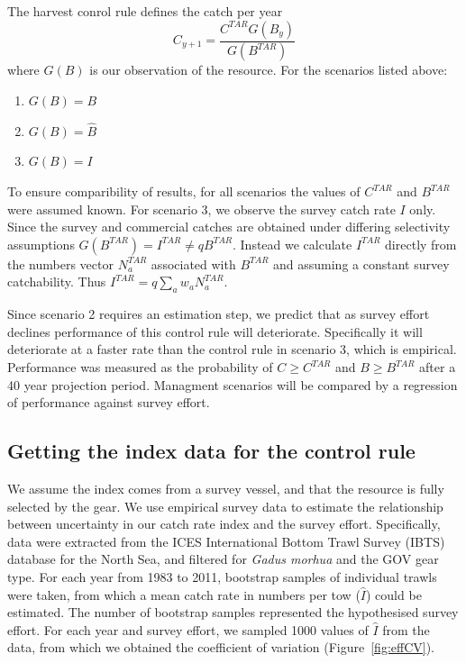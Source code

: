\documentclass[a4paper]{article}
\begin{document}
The harvest conrol rule defines the catch per year
\[
C_{y+1} = \frac{C^{TAR}G(B_y)}{G(B^{TAR})}
\]
where $G(B)$ is our observation of the resource. For the scenarios listed above:
\begin{enumerate}
\item $G(B) = B$
\item $G(B) = \hat{B}$
\item $G(B) = I$
\end{enumerate}

To ensure comparibility of results, for all scenarios the values of $C^{TAR}$ and $B^{TAR}$ were assumed known. 
For scenario 3, we observe the survey catch rate $I$ only. Since the survey and commercial catches are obtained under differing
selectivity assumptions $G(B^{TAR}) = I^{TAR} \neq qB^{TAR}$. Instead we calculate $I^{TAR}$ directly from the numbers vector $N^{TAR}_a$
associated with $B^{TAR}$ and assuming a constant survey catchability. Thus $I^{TAR} = q\sum_a{w_a N^{TAR}_a}$.

Since scenario 2 requires an estimation step, we predict that as survey effort declines performance of this control rule will deteriorate.
Specifically it will deteriorate at a faster rate than the control rule in scenario 3, which is empirical. Performance was measured as the 
probability of $C\geq C^{TAR}$ and $B\geq B^{TAR}$ after a 40 year projection period. Managment scenarios will be compared by a regression of 
performance against survey effort. 


\subsection{Getting the index data for the control rule}

We assume the index comes from a survey vessel, and that the resource is fully selected by the gear. 
We use empirical survey data to estimate the relationship between uncertainty in our catch rate index and the survey effort. Specifically, data
were extracted from the ICES International Bottom Trawl Survey (IBTS) database for the North Sea, and filtered for \textit{Gadus morhua} and the GOV gear type.
For each year from 1983 to 2011, bootstrap samples of individual trawls were taken, from which a mean catch rate in numbers per tow ($\hat{I}$) could
be estimated. The number of bootstrap samples represented the hypothesised survey effort. For each year and survey effort, we sampled 1000 values of $\hat{I}$
from the data, from which we obtained the coefficient of variation (Figure~\ref{fig:effCV}).
\end{document}
